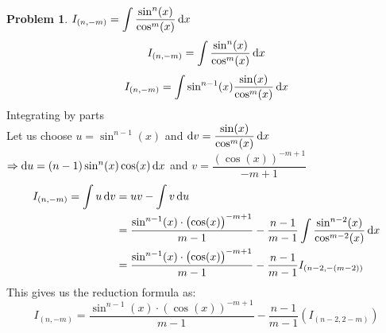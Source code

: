 \documentclass[14]{article}
\theoremstyle{definition}
\newtheorem{prob}{Problem}
\theoremstyle{case}
\begin{document}
\begin{prob}
$I_{(n, -m)} = \displaystyle \int \dfrac{\sin^n(x)}{\cos^m(x)} \dif x$
\[I_{(n, -m)} = \int \dfrac{\sin^n(x)}{\cos^m(x)} \dif x\]
\[I_{(n, -m)} = \int\sin^{n-1}(x) \dfrac{\sin(x)}{\cos^m(x)} \dif x\]
Integrating by parts\\
Let us choose $u = \sin^{n-1}(x)$ and $\dif v = \dfrac{\sin(x)}{\cos^m(x)} \dif x$\\
$\Rightarrow \dif u = (n-1)\sin^{n}(x) \cos(x) \dif x$ and $v = \dfrac{\left(\cos(x)\right)^{-m+1}}{-m+1}$
\begin{align*}
I_{(n, -m)} = \int u \dif v &= uv - \int v \dif u\\
&= \dfrac{\sin^{n-1}(x)\cdot \left(\cos(x)\right)^{-m+1}}{m-1} - \dfrac{n-1}{m-1} \int \dfrac{\sin^{n-2}(x)}{\cos^{m-2}(x)}\dif x\\
&= \dfrac{\sin^{n-1}(x)\cdot \left(\cos(x)\right)^{-m+1}}{m-1} - \dfrac{n-1}{m-1} I_{(n-2, -(m-2))}
\end{align*}
This gives us the reduction formula as:
\[I_{(n, -m)}= \dfrac{\sin^{n-1}(x)\cdot \left(\cos(x)\right)^{-m+1}}{m-1} - \dfrac{n-1}{m-1} \left(I_{(n-2, 2-m)}\right)\]
\end{prob}
\pagebreak
\end{document}
